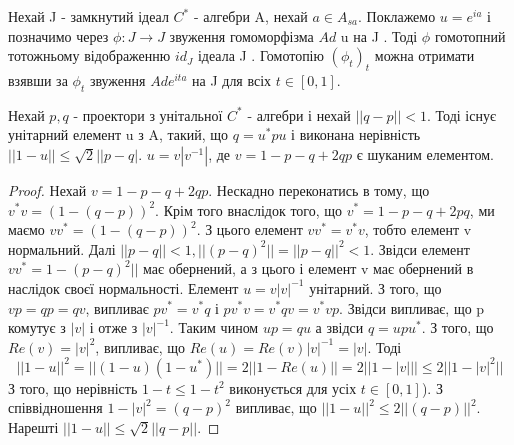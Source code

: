 \begin{example}
    Нехай J - замкнутий ідеал $C^*$ - алгебри A, нехай $a \in A_{sa}$.
    Поклажемо $u = e^{ia}$ і позначимо через $\phi: J \rightarrow J$ звуження гомоморфізма $Ad$ u на J .
    Тоді $\phi$ гомотопний тотожньому відображенню $id_J$ ідеала J .
    Гомотопію $(\phi_t)_t$ можна отримати взявши за $\phi_t$ звуження $Ad e^{ita}$ на J для всіх $t \in [0,1]$.
\end{example}

\begin{lemma}
    \label{лема:гомотопічна інваріантність}
    Нехай $p,q$ - проектори з унітальної $C^*$ - алгебри і нехай $||q - p|| < 1$.
    Тоді існує унітарний елемент u з A, такий, що $q = u^* p u$ і виконана нерівність
    $||1 - u|| \leq \sqrt{2}||p - q|$. $u = v |v^{-1}|$, де $v = 1 - p - q + 2qp$ є шуканим елементом.

    \begin{proof}
        Нехай $v = 1 - p - q + 2qp$.
        Нескадно переконатись в тому, що $v^* v= (1 - (q - p))^2$.
        Крім того внаслідок того, що $v^* = 1 - p - q + 2pq$, ми маємо $v v^* = (1 - (q - p))^2$.
        З цього елемент $v v^* = v^* v$, тобто елемент v нормальний.
        Далі $||p - q|| < 1, ||(p-q)^2|| = ||p - q||^2 < 1$.
        Звідси елемент $v v^* = 1 - (p-q)^2||$ має обернений,
        а з цього і елемент v має обернений в наслідок своєї нормальності.
        Елемент $u = v |v|^{-1}$ унітарний.
        З того, що $vp = qp = qv$, випливає $pv^* = v^* q$ і $p v^* v = v^* q v = v^* v p$.
        Звідси випливає, що p комутує з $|v|$ і отже з $|v|^{-1}$.
        Таким чином $up = qu$ а звідси $q = u p u^*$.
        З того, що $Re(v) = |v|^2$, випливає, що $Re(u) = Re(v)|v|^{-1} = |v|$.
        Тоді
        \begin{equation*}
            ||1 - u||^2 = ||(1 - u)(1 - u^*)|| = 2 ||1 - Re(u)|| = 2||1-|v||| \leq 2||1-|v|^2||
        \end{equation*}
        З того, що нерівність $1 - t \leq 1 - t^2$ виконується для усіх $t \in [0,1]$).
        З \\
        співвідношення $1 - |v|^2 = (q-p)^2$ випливає, що $||1 - u||^2 \leq 2||(q - p)||^2$.
        Нарешті $||1 - u|| \leq \sqrt{2} ||q - p||$.
    \end{proof}
\end{lemma}

